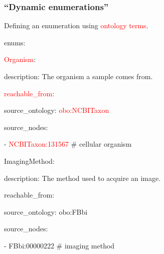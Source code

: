 \begin{frame}
  \frametitle{``Dynamic enumerations''}

  Defining an enumeration using \textcolor<4>{red}{ontology terms}.

\begin{semiverbatim}
enums:

\hspace{1em}\textcolor<2>{red}{Organism}:

\hspace{2em}description: The organism a sample comes from.

\hspace{2em}\textcolor<3>{red}{reachable\_from}:

\hspace{3em}source\_ontology: \textcolor<4>{red}{obo:NCBITaxon}

\hspace{3em}source\_nodes:

\hspace{4em}- \textcolor<4>{red}{NCBITaxon:131567} \# cellular organism

\medskip
\hspace{1em}ImagingMethod:

\hspace{2em}description: The method used to acquire an image.

\hspace{2em}reachable\_from:

\hspace{3em}source\_ontology: obo:FBbi

\hspace{3em}source\_nodes:

\hspace{4em}- FBbi:00000222 \# imaging method
\end{semiverbatim}
\end{frame}

